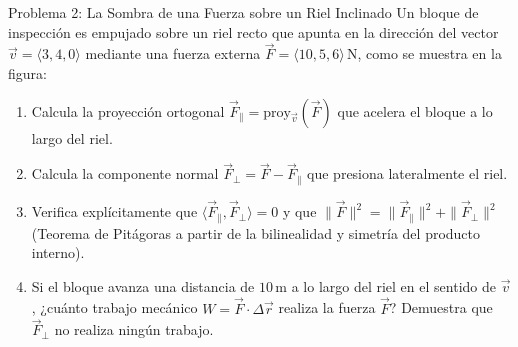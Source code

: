 \documentclass[11pt,letterpaper]{article}
\begin{document}
\begin{infobox}{Problema 2: La Sombra de una Fuerza sobre un Riel Inclinado}
Un bloque de inspección es empujado sobre un riel recto que apunta en la dirección del vector $\vec{v} = \langle 3, 4, 0 \rangle$ mediante una fuerza externa $\vec{F} = \langle 10, 5, 6 \rangle\,\text{N}$, como se muestra en la figura:

\begin{center}
\end{center}

\begin{enumerate}[label=(\alph*)]
    \item Calcula la proyección ortogonal $\vec{F}_\parallel = \text{proy}_{\vec{v}}(\vec{F})$ que acelera el bloque a lo largo del riel.
    \item Calcula la componente normal $\vec{F}_\perp = \vec{F} - \vec{F}_\parallel$ que presiona lateralmente el riel.
    \item Verifica explícitamente que $\langle \vec{F}_\parallel, \vec{F}_\perp \rangle = 0$ y que $\|\vec{F}\|^2 = \|\vec{F}_\parallel\|^2 + \|\vec{F}_\perp\|^2$ (Teorema de Pitágoras a partir de la bilinealidad y simetría del producto interno).
    \item Si el bloque avanza una distancia de $10\,\text{m}$ a lo largo del riel en el sentido de $\vec{v}$, ¿cuánto trabajo mecánico $W = \vec{F}\cdot\Delta\vec{r}$ realiza la fuerza $\vec{F}$? Demuestra que $\vec{F}_\perp$ no realiza ningún trabajo.
\end{enumerate}
\end{infobox}
\end{document}
